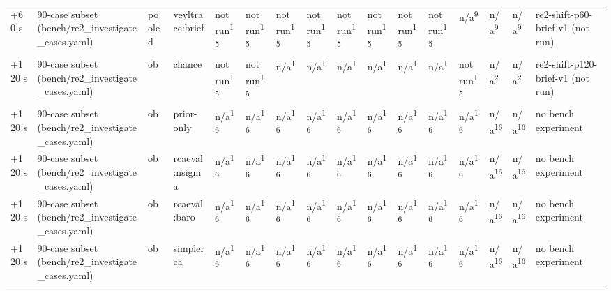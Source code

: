 \begin{table}[t]
\begin{tabular}{llllllllllllllll}
+60 s & 90-case subset (bench/re2\_investigate\_cases.yaml) & pooled & veyltrace:brief & not run\textsuperscript{15} & not run\textsuperscript{15} & not run\textsuperscript{15} & not run\textsuperscript{15} & not run\textsuperscript{15} & not run\textsuperscript{15} & not run\textsuperscript{15} & not run\textsuperscript{15} & n/a\textsuperscript{9} & n/a\textsuperscript{9} & n/a\textsuperscript{9} & re2-shift-p60-brief-v1 (not run) \\
+120 s & 90-case subset (bench/re2\_investigate\_cases.yaml) & ob & chance & not run\textsuperscript{15} & not run\textsuperscript{15} & n/a\textsuperscript{1} & n/a\textsuperscript{1} & n/a\textsuperscript{1} & n/a\textsuperscript{1} & n/a\textsuperscript{1} & n/a\textsuperscript{1} & not run\textsuperscript{15} & n/a\textsuperscript{2} & n/a\textsuperscript{2} & re2-shift-p120-brief-v1 (not run) \\
+120 s & 90-case subset (bench/re2\_investigate\_cases.yaml) & ob & prior-only & n/a\textsuperscript{16} & n/a\textsuperscript{16} & n/a\textsuperscript{16} & n/a\textsuperscript{16} & n/a\textsuperscript{16} & n/a\textsuperscript{16} & n/a\textsuperscript{16} & n/a\textsuperscript{16} & n/a\textsuperscript{16} & n/a\textsuperscript{16} & n/a\textsuperscript{16} & no bench experiment \\
+120 s & 90-case subset (bench/re2\_investigate\_cases.yaml) & ob & rcaeval:nsigma & n/a\textsuperscript{16} & n/a\textsuperscript{16} & n/a\textsuperscript{16} & n/a\textsuperscript{16} & n/a\textsuperscript{16} & n/a\textsuperscript{16} & n/a\textsuperscript{16} & n/a\textsuperscript{16} & n/a\textsuperscript{16} & n/a\textsuperscript{16} & n/a\textsuperscript{16} & no bench experiment \\
+120 s & 90-case subset (bench/re2\_investigate\_cases.yaml) & ob & rcaeval:baro & n/a\textsuperscript{16} & n/a\textsuperscript{16} & n/a\textsuperscript{16} & n/a\textsuperscript{16} & n/a\textsuperscript{16} & n/a\textsuperscript{16} & n/a\textsuperscript{16} & n/a\textsuperscript{16} & n/a\textsuperscript{16} & n/a\textsuperscript{16} & n/a\textsuperscript{16} & no bench experiment \\
+120 s & 90-case subset (bench/re2\_investigate\_cases.yaml) & ob & simplerca & n/a\textsuperscript{16} & n/a\textsuperscript{16} & n/a\textsuperscript{16} & n/a\textsuperscript{16} & n/a\textsuperscript{16} & n/a\textsuperscript{16} & n/a\textsuperscript{16} & n/a\textsuperscript{16} & n/a\textsuperscript{16} & n/a\textsuperscript{16} & n/a\textsuperscript{16} & no bench experiment \\

\end{tabular}
\end{table}
